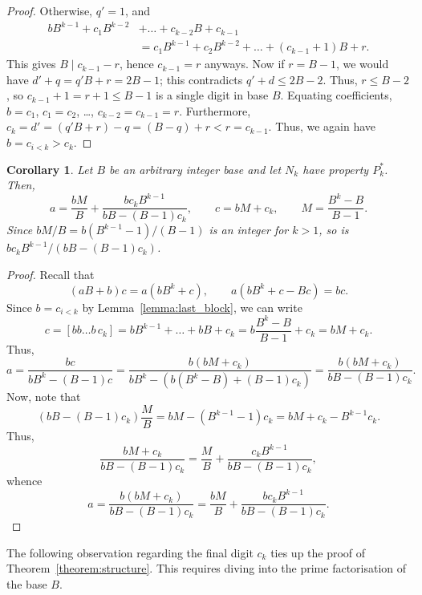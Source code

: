 \documentclass[sn-mathphys]{sn-jnl}%
\theoremstyle{thmstyleone}%
\newtheorem{corollary}[theorem]{Corollary}
\theoremstyle{thmstyletwo}%
\theoremstyle{thmstylethree}%
\begin{document}
\begin{appendices}
\begin{proof}
    Otherwise, $q' = 1$, and \begin{align*}
        bB^{k - 1} + c_1B^{k - 2} &+ \dots + c_{k - 2}B + c_{k - 1} \\
        &= c_1B^{k - 1} + c_2B^{k - 2} + \dots + (c_{k - 1} + 1)B + r.
    \end{align*}
    This gives $B \mid c_{k - 1} - r$, hence $c_{k - 1} = r$ anyways. Now if $r = B - 1$,
    we would have $d' + q = q'B + r = 2B - 1$; this contradicts $q' + d \leq 2B - 2$.
    Thus, $r \leq B - 2$, so $c_{k - 1} + 1 = r + 1 \leq B - 1$ is a single digit in base $B$.
    Equating coefficients, $b = c_1$, $c_1 = c_2$, \dots, $c_{k - 2} = c_{k - 1} = r$.
    Furthermore, $c_k = d' = (q'B + r) - q = (B - q) + r < r = c_{k - 1}$. Thus, we again have
    $b = c_{i < k} > c_k$.
\end{proof}

\begin{corollary} \label{corollary:ac_blocks}
    Let $B$ be an arbitrary integer base and let $N_k$ have property $P^*_k$.
    Then, \[
        a = \frac{bM}{B} + \frac{bc_kB^{k - 1}}{bB - (B - 1)c_k}, \qquad 
        c = bM + c_k, \qquad
        M = \frac{B^k - B}{B - 1}.
    \] Since $bM / B = b(B^{k - 1} - 1) / (B - 1)$ is an integer for $k > 1$, so is
    $bc_kB^{k - 1} / (bB - (B - 1)c_k)$.
\end{corollary}
\begin{proof}
    Recall that \[
        (aB + b)c = a(bB^k + c), \qquad
        a(bB^k + c - Bc) = bc.
    \] Since $b = c_{i < k}$ by Lemma~\ref{lemma:last_block}, we can write \[
        c = [bb\dots b\,c_k] = bB^{k - 1} + \dots + bB + c_k = 
        b\frac{B^k - B}{B - 1} + c_k = bM + c_k.
    \] Thus, \[
        a = \frac{bc}{bB^k - (B - 1)c} = \frac{b(bM + c_k)}{bB^k - (b(B^k - B) + (B - 1)c_k)} 
        = \frac{b(bM + c_k)}{bB - (B - 1)c_k}.
    \] Now, note that \[
        (bB - (B - 1)c_k)\frac{M}{B} = bM - (B^{k - 1} - 1)c_k = bM + c_k - B^{k - 1}c_k.
    \] Thus, \[
        \frac{bM + c_k}{bB - (B - 1)c_k} = \frac{M}{B} + \frac{c_kB^{k - 1}}{bB - (B - 1)c_k},
    \] whence \[
        a = \frac{b(bM + c_k)}{bB - (B - 1)c_k} = \frac{bM}{B} + 
        \frac{bc_kB^{k - 1}}{bB - (B - 1)c_k}. %
    \]
\end{proof}

The following observation regarding the final digit $c_k$ ties up the
proof of Theorem~\ref{theorem:structure}. This requires diving into the
prime factorisation of the base $B$.


\end{appendices}
\end{document}
